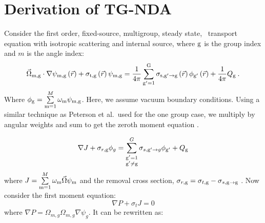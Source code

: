 
\section{Derivation of TG-NDA}
Consider the first order, fixed-source, multigroup, steady state, \sn\ transport equation with isotropic scattering and internal source, where $\mathrm{g}$ is the group index and $m$ is the angle index:
  \begin{equation}
  \vec{\Omega}_{\mathrm{m},\mathrm{g}}\cdot \nabla \psi_{\mathrm{m},\mathrm{g}} \left(\vec{r}\right)+ \sigma_{\mathrm{t},\mathrm{g}}\left(\vec{r}\right)\psi_{\mathrm{m},\mathrm{g}} = \frac{1}{4 \pi} \sum\limits_{\mathrm{g}'=1}^{\mathrm{G}} \sigma_{\mathrm{s},{\mathrm{g}'}\to\mathrm{g}}\left(\vec{r}\right) \phi_{\mathrm{g}'}\left(\vec{r}\right) + \frac{1}{4 \pi} Q_{\mathrm{g}}\:.
  \end{equation}
  Where $\phi_{\mathrm{g}} = \sum\limits_{\mathrm{m}=1}^M \omega_{\mathrm{m}} \psi_{\mathrm{m}, \mathrm{g}}$. Here, we assume vacuum boundary conditions. Using a similar technique as Peterson et al.\ used for the one group case, we multiply by angular weights and sum to get the zeroth moment equation \cite{morel-holo}.

  \begin{equation}
  \nabla J + \sigma_{r,\mathrm{g}}\phi_g  = \sum_{\substack{\mathrm{g}'=1 \\ \mathrm{g}' \neq \mathrm{g}}}^G \sigma_{s,\mathrm{g}' \rightarrow g}\phi_{\mathrm{g}'} + Q_{\mathrm{g}}
  \label{eq:zeroth_moment}
  \end{equation}
where $J = \sum\limits_{\mathrm{m}=1}^{M}\omega_{\mathrm{m}} \vec{\Omega}\psi_{\mathrm{m}}$ and the removal cross section, $\sigma_{r, \mathrm{g}} = \sigma_{t, \mathrm{g}} - \sigma_{s, \mathrm{g} \rightarrow \mathrm{g}}$ . 
  Now consider the first moment equation:
  \begin{equation}
  \nabla P + \sigma_t J = 0
  \end{equation}
where $\nabla P =  \Omega_{m,g} \Omega_{m,g} \nabla \psi_{g}$. It can be rewritten as: 

